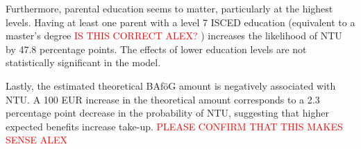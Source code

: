 Furthermore, parental education seems to matter, particularly at the highest levels. Having at least one parent with a level 7 ISCED education (equivalent to a master’s degree \textcolor{red}{IS THIS CORRECT ALEX?}
) increases the likelihood of NTU by 47.8 percentage points. The effects of lower education levels are not statistically significant in the model.

Lastly, the estimated theoretical BAföG amount is negatively associated with NTU. A 100 EUR increase in the theoretical amount corresponds to a 2.3 percentage point decrease in the probability of NTU, suggesting that higher expected benefits increase take-up. \textcolor{red}{PLEASE CONFIRM THAT THIS MAKES SENSE ALEX}


